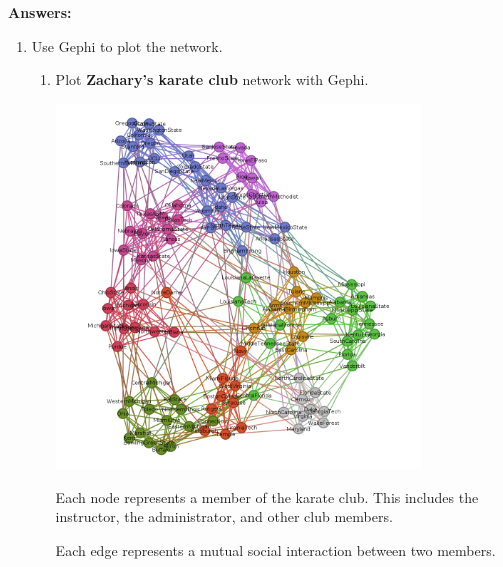 \documentclass{amsart}
\theoremstyle{definition}
\theoremstyle{remark}
\numberwithin{equation}{section}
\begin{document}
\vspace{0.5 cm}


\textbf{Answers:}

\vspace{0.5 cm}

\begin{enumerate}
    \item Use Gephi to plot the network. \vspace{0.5 cm}
    \begin{enumerate}
        \item Plot \textbf{Zachary's karate club} network with Gephi. \vspace{0.5 cm}
        \centering
        \begin{minipage}{1\textwidth}
        \centering
        \includegraphics[width=0.8\textwidth]{images/football_v0.png} %
        \end{minipage}

        Each node represents a member of the karate club. This includes the instructor, the administrator, and other club members. 
        
        Each edge represents a mutual social interaction between two members. 

        \vspace{0.5 cm}


\end{enumerate}
\end{enumerate}
\end{document}
